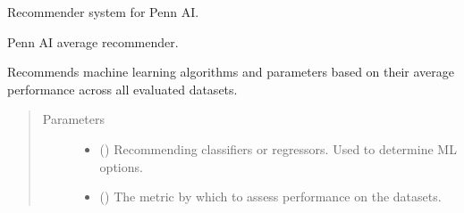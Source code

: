 \documentclass[letterpaper,10pt,english]{sphinxmanual}
\begin{document}
\label{\detokenize{index:module-ai.recommender.average_recommender}}
Recommender system for Penn AI.

\begin{fulllineitems}
\label{\detokenize{index:ai.recommender.average_recommender.AverageRecommender}}
Penn AI average recommender.

Recommends machine learning algorithms and parameters based on their average performance
across all evaluated datasets.
\begin{quote}\begin{description}
\item[{Parameters}] \leavevmode\begin{itemize}
\item {} 
 (\sphinxstyleliteralemphasis{\sphinxupquote{, }}) \textendash{} Recommending classifiers or regressors. Used to determine ML options.

\item {} 
 (\sphinxstyleliteralemphasis{\sphinxupquote{ (}}\sphinxstyleliteralemphasis{\sphinxupquote{, }}\sphinxstyleliteralemphasis{\sphinxupquote{)}}) \textendash{} The metric by which to assess performance on the datasets.

\end{itemize}

\end{description}\end{quote}


\end{fulllineitems}
\end{document}
